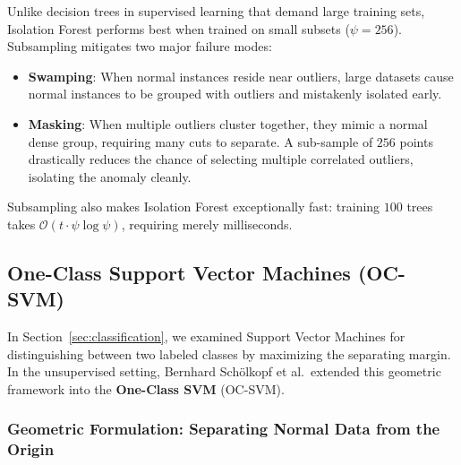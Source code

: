 \begin{keyidea}[Why Subsampling ($\psi = 256$) Eliminates Swamping and Masking]
Unlike decision trees in supervised learning that demand large training sets, Isolation Forest performs best when trained on small subsets ($\psi = 256$). Subsampling mitigates two major failure modes:
\begin{itemize}
    \item \textbf{Swamping}: When normal instances reside near outliers, large datasets cause normal instances to be grouped with outliers and mistakenly isolated early.
    \item \textbf{Masking}: When multiple outliers cluster together, they mimic a normal dense group, requiring many cuts to separate. A sub-sample of $256$ points drastically reduces the chance of selecting multiple correlated outliers, isolating the anomaly cleanly.
\end{itemize}
Subsampling also makes Isolation Forest exceptionally fast: training $100$ trees takes $\mathcal{O}(t \cdot \psi \log \psi)$, requiring merely milliseconds.
\end{keyidea}

\subsection{One-Class Support Vector Machines (OC-SVM)}\label{subsec:one_class_svm}

In Section~\ref{sec:classification}, we examined Support Vector Machines for distinguishing between two labeled classes by maximizing the separating margin. In the unsupervised setting, Bernhard Schölkopf et al.~extended this geometric framework into the \textbf{One-Class SVM} (OC-SVM).

\subsubsection{Geometric Formulation: Separating Normal Data from the Origin}

